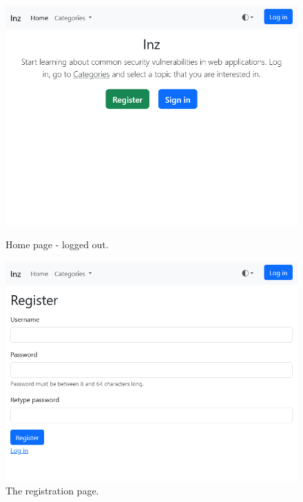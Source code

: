 \begin{figure}
    \centering
    \begin{minipage}{0.48\textwidth}
        \centering
        \includegraphics[width=\textwidth]{img/manual-home.png}
        \caption{Home page - logged out.}
        \label{fig:manual-home}
    \end{minipage}
    \hfill
    \begin{minipage}{0.48\textwidth}
        \centering
        \includegraphics[width=\textwidth]{img/manual-registration.png}
        \caption{The registration page.}
        \label{fig:manual-registration}
    \end{minipage}
\end{figure}

